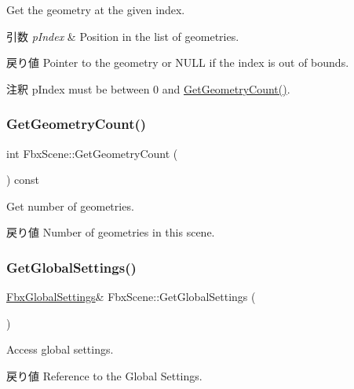 Get the geometry at the given index. 
\begin{DoxyParams}{引数}
{\em p\+Index} & Position in the list of geometries. \\
\hline
\end{DoxyParams}
\begin{DoxyReturn}{戻り値}
Pointer to the geometry or {\ttfamily N\+U\+LL} if the index is out of bounds. 
\end{DoxyReturn}
\begin{DoxyRemark}{注釈}
p\+Index must be between 0 and \hyperlink{class_fbx_scene_aab367e33255510f9a6db9b8b56efc873}{Get\+Geometry\+Count()}. 
\end{DoxyRemark}
\mbox{\label{class_fbx_scene_aab367e33255510f9a6db9b8b56efc873}} 
\subsubsection{\texorpdfstring{Get\+Geometry\+Count()}{GetGeometryCount()}}
{\footnotesize\ttfamily int Fbx\+Scene\+::\+Get\+Geometry\+Count (\begin{DoxyParamCaption}{ }\end{DoxyParamCaption}) const}

Get number of geometries. \begin{DoxyReturn}{戻り値}
Number of geometries in this scene. 
\end{DoxyReturn}
\mbox{\label{class_fbx_scene_a0cb767181a743532c9e9be17f0348570}} 
\subsubsection{\texorpdfstring{Get\+Global\+Settings()}{GetGlobalSettings()}\hspace{0.1cm}{\footnotesize\ttfamily [1/2]}}
{\footnotesize\ttfamily \hyperlink{class_fbx_global_settings}{Fbx\+Global\+Settings}\& Fbx\+Scene\+::\+Get\+Global\+Settings (\begin{DoxyParamCaption}{ }\end{DoxyParamCaption})}

Access global settings. \begin{DoxyReturn}{戻り値}
Reference to the Global Settings. 
\end{DoxyReturn}
\mbox{\label{class_fbx_scene_a223ba0266f854f8243f9f6b2350a9404}} 
